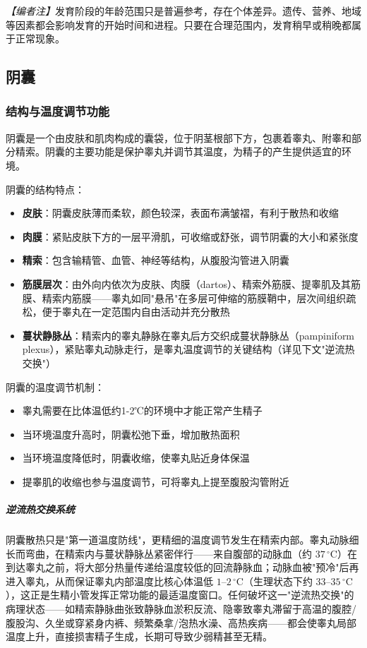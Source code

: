 \documentclass[12pt,a4paper,twoside]{ctexbook}
\begin{document}
\noindent\textit{【编者注】}发育阶段的年龄范围只是普遍参考，存在个体差异。遗传、营养、地域等因素都会影响发育的开始时间和进程。只要在合理范围内，发育稍早或稍晚都属于正常现象。

\subsection{阴囊}
\subsubsection{结构与温度调节功能}

阴囊是一个由皮肤和肌肉构成的囊袋，位于阴茎根部下方，包裹着睾丸、附睾和部分精索。阴囊的主要功能是保护睾丸并调节其温度，为精子的产生提供适宜的环境。

阴囊的结构特点：
\begin{itemize}
    \item \textbf{皮肤}：阴囊皮肤薄而柔软，颜色较深，表面布满皱褶，有利于散热和收缩
    \item \textbf{肉膜}：紧贴皮肤下方的一层平滑肌，可收缩或舒张，调节阴囊的大小和紧张度
    \item \textbf{精索}：包含输精管、血管、神经等结构，从腹股沟管进入阴囊
    \item \textbf{筋膜层次}：由外向内依次为皮肤、肉膜（dartos）、精索外筋膜、提睾肌及其筋膜、精索内筋膜——睾丸如同"悬吊"在多层可伸缩的筋膜鞘中，层次间组织疏松，便于睾丸在一定范围内自由活动并充分散热
    \item \textbf{蔓状静脉丛}：精索内的睾丸静脉在睾丸后方交织成蔓状静脉丛（pampiniform plexus），紧贴睾丸动脉走行，是睾丸温度调节的关键结构（详见下文"逆流热交换"）
\end{itemize}

阴囊的温度调节机制：
\begin{itemize}
    \item 睾丸需要在比体温低约1-2℃的环境中才能正常产生精子
    \item 当环境温度升高时，阴囊松弛下垂，增加散热面积
    \item 当环境温度降低时，阴囊收缩，使睾丸贴近身体保温
    \item 提睾肌的收缩也参与温度调节，可将睾丸上提至腹股沟管附近
\end{itemize}

\subparagraph{逆流热交换系统}

阴囊散热只是"第一道温度防线"，更精细的温度调节发生在精索内部。睾丸动脉细长而弯曲，在精索内与蔓状静脉丛紧密伴行——来自腹部的动脉血（约 $37\,^{\circ}\mathrm{C}$）在到达睾丸之前，将大部分热量传递给温度较低的回流静脉血；动脉血被"预冷"后再进入睾丸，从而保证睾丸内部温度比核心体温低 $1$--$2\,^{\circ}\mathrm{C}$（生理状态下约 $33$--$35\,^{\circ}\mathrm{C}$），这正是生精小管发挥正常功能的最适温度窗口。任何破坏这一"逆流热交换"的病理状态——如精索静脉曲张致静脉血淤积反流、隐睾致睾丸滞留于高温的腹腔/腹股沟、久坐或穿紧身内裤、频繁桑拿/泡热水澡、高热疾病——都会使睾丸局部温度上升，直接损害精子生成，长期可导致少弱精甚至无精。
\end{document}
